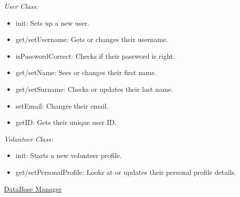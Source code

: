 \documentclass[a4paper,12pt]{report}
\begin{document}
			
			\textit{User Class:} 
			\begin{itemize}
				\item	init: Sets up a new user.
				\item	get/setUsername: Gets or changes their username.
				\item	isPasswordCorrect: Checks if their password is right.
				\item	get/setName: Sees or changes their first name.
				\item	get/setSurname: Checks or updates their last name.
				\item	setEmail: Changes their email.
				\item	getID: Gets their unique user ID.
			\end{itemize}
			
			
			\textit{Volunteer Class:} 
			\begin{itemize}
		\item	init: Starts a new volunteer profile.
		\item	get/setPersonalProfile: Looks at or updates their personal profile details.
			\end{itemize}
			
				\underline{DataBase Manager} \\
			
\end{document}
